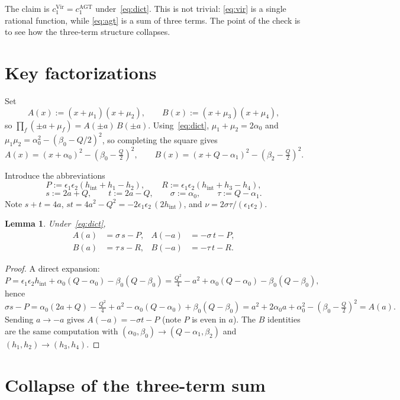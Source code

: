 \documentclass[11pt]{article}
\newtheorem{lemma}{Lemma}
\begin{document}
\medskip

\noindent
The claim is $c_1^{\mathrm{Vir}}=c_1^{\mathrm{AGT}}$ under~\eqref{eq:dict}.
This is not trivial: \eqref{eq:vir} is a single rational function, while
\eqref{eq:agt} is a sum of three terms. The point of the check is to see how
the three-term structure collapses.

\section*{Key factorizations}

Set
\[
A(x):=(x+\mu_1)(x+\mu_2),\qquad B(x):=(x+\mu_3)(x+\mu_4),
\]
so $\prod_f(\pm a+\mu_f)=A(\pm a)\,B(\pm a)$.
Using~\eqref{eq:dict}, $\mu_1+\mu_2=2\alpha_0$ and
$\mu_1\mu_2=\alpha_0^2-(\beta_0-Q/2)^2$, so completing the square gives
\[
A(x)=(x+\alpha_0)^2-(\beta_0-\tfrac{Q}{2})^2,
\qquad
B(x)=(x+Q-\alpha_1)^2-(\beta_2-\tfrac{Q}{2})^2.
\]

Introduce the abbreviations
\[
P:=\epsilon_1\epsilon_2(h_{\mathrm{int}}+h_1-h_2),\qquad
R:=\epsilon_1\epsilon_2(h_{\mathrm{int}}+h_3-h_4),
\]
\[
s:=2a+Q,\qquad t:=2a-Q,\qquad
\sigma:=\alpha_0,\qquad \tau:=Q-\alpha_1.
\]
Note $s+t=4a$, $st=4a^2-Q^2=-2\epsilon_1\epsilon_2\,(2h_{\mathrm{int}})$, and
$\nu=2\sigma\tau/(\epsilon_1\epsilon_2)$.

\begin{lemma}
\label{lem:linear}
Under~\eqref{eq:dict},
\begin{align*}
A(a)  &= \sigma\,s - P, & A(-a) &= -\sigma\,t - P,\\
B(a)  &= \tau\,s - R,   & B(-a) &= -\tau\,t - R.
\end{align*}
\end{lemma}

\begin{proof}
A direct expansion:
\[
P=\epsilon_1\epsilon_2 h_{\mathrm{int}}+\alpha_0(Q-\alpha_0)-\beta_0(Q-\beta_0)
 =\tfrac{Q^2}{4}-a^2+\alpha_0(Q-\alpha_0)-\beta_0(Q-\beta_0),
\]
hence
\[
\sigma s - P
=\alpha_0(2a+Q)-\tfrac{Q^2}{4}+a^2-\alpha_0(Q-\alpha_0)+\beta_0(Q-\beta_0)
=a^2+2\alpha_0 a+\alpha_0^2-(\beta_0-\tfrac{Q}{2})^2
=A(a).
\]
Sending $a\to -a$ gives $A(-a)=-\sigma t-P$ (note $P$ is even in $a$).
The $B$ identities are the same computation with $(\alpha_0,\beta_0)\to(Q-\alpha_1,\beta_2)$
and $(h_1,h_2)\to(h_3,h_4)$.
\end{proof}

\section*{Collapse of the three-term sum}
\end{document}
